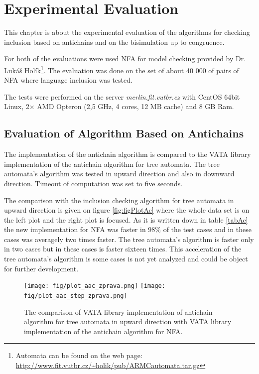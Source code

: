 \chapter{Experimental Evaluation}
\label{eval}
This chapter is about the experimental evaluation of the algorithms for checking inclusion based on antichains and on the bisimulation up to congruence. 

For both of the evaluations were used NFA for model checking provided by Dr. Lukáš Holík\footnote{
Automata can be found on the web page: \url{http://www.fit.vutbr.cz/~holik/pub/ARMCautomata.tar.gz}}.  
The evaluation was done on the set of about 40 000 of pairs of NFA where language inclusion was tested. 

The tests were performed on the server \emph{merlin.fit.vutbr.cz} with CentOS 64bit Linux, 2$\times$ AMD Opteron (2,5 GHz, 4 cores, 12 MB cache) and 8 GB Ram.

\section{Evaluation of Algorithm Based on Antichains}
The implementation of the antichain algorithm is compared to the VATA library implementation of the antichain algorithm for tree automata. The tree automata's
algorithm was tested in upward direction and also in downward direction. Timeout of computation was set to five seconds.

The comparison with the inclusion checking algorithm for tree automata in upward direction is given on figure \ref{fig:figPlotAc} where the whole data
set is on the left plot and the right plot is focused. As it is written down in table \ref{tabAc} the new implementation for NFA was faster in 98\% of the
test cases and in these cases was averagely two times faster. The tree automata's algorithm is faster only in two cases but in these cases is faster sixteen times.
This acceleration of the tree automata's algorithm is some cases is not yet analyzed and could be object for further development.

\begin{figure}[bt]
\begin{center}
\texttt{[image: fig/plot\_aac\_zprava.png]}
\texttt{[image: fig/plot\_aac\_step\_zprava.png]}
\caption{The comparison of VATA library implementation of antichain algorithm for tree automata in upward direction
    with VATA library implementation of the antichain algorithm for NFA.}
\label{fig:figPlotAac}
\end{center}
\end{figure}

